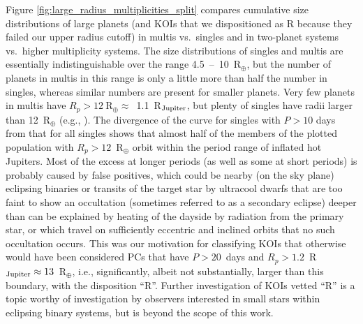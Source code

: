 \documentclass{aastex62}
\begin{document}
Figure \ref{fig:large_radius_multiplicities_split}
compares cumulative size distributions of large planets (and KOIs that we dispositioned as R because they failed our upper radius cutoff)  in multis vs.~singles and in two-planet systems vs.~higher multiplicity systems. The size distributions of singles and multis are essentially indistinguishable  over the range 4.5~--~10~R$_\oplus$, but the number of planets in multis  in this range %
is only a little more than half the number in singles, whereas similar numbers are present for smaller planets.  Very few planets in multis have $R_p > 12~$R$_\oplus \approx$~1.1~R$_{\rm Jupiter}$, but plenty of singles have radii larger than 12~R$_\oplus$ (e.g., \citealt{Santerne:2016}).  The divergence of the curve for singles with $P > 10$ days from that for all singles shows that almost half of the members of the plotted population with  $R_p > 12$~R$_\oplus$ orbit within the period range of inflated hot Jupiters.  Most of the excess at longer periods (as well as some at short periods) is probably caused by false positives, which could be nearby (on the sky plane) eclipsing binaries or transits of the target star by ultracool dwarfs that are too faint to show an occultation (sometimes referred to as a secondary eclipse) deeper than can be explained by heating of the dayside by radiation from the primary star, or which travel on sufficiently eccentric and inclined orbits that no such occultation occurs. This was our motivation for classifying KOIs that otherwise would have been considered PCs that have $P>20$~days and $R_p > 1.2$~R$_{\rm Jupiter} \approx 13$~R$_\oplus$, i.e., significantly, albeit not substantially, larger than this boundary, with the disposition ``R''. Further investigation of KOIs vetted ``R'' is a topic worthy of investigation by observers interested in small stars within eclipsing binary systems, but is beyond the scope of this work.
\end{document}
